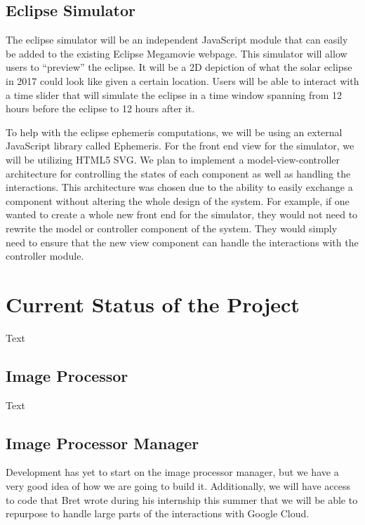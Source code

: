 \documentclass[10pt, onecolumn, draftclsnofoot, letterpaper, compsoc]{IEEEtran}
\begin{document}
\subsection{Eclipse Simulator}

The eclipse simulator will be an independent JavaScript module that can easily
be added to the existing Eclipse Megamovie webpage. This simulator will allow
users to “preview” the eclipse. It will be a 2D depiction of what the solar
eclipse in 2017 could look like given a certain location. Users will be able
to interact with a time slider that will simulate the eclipse in a time
window spanning from 12 hours before the eclipse to 12 hours after it.

To help with the eclipse ephemeris computations, we will be using an external
JavaScript library called Ephemeris. For the front end view for the simulator,
we will be utilizing HTML5 SVG. We plan to implement a model-view-controller
architecture for controlling the states of each component as well as handling
the interactions. This architecture was chosen due to the ability to easily
exchange a component without altering the whole design of the system. For
example, if one wanted to create a whole new front end for the simulator,
they would not need to rewrite the model or controller component of the system.
They would simply need to ensure that the new view component can handle the
interactions with the controller module.


\section{Current Status of the Project}

Text

\subsection{Image Processor}

Text

\subsection{Image Processor Manager}

Development has yet to start on the image processor manager, but we have a very good idea of how we
are going to build it. Additionally, we will have access to code that Bret wrote during his internship
this summer that we will be able to repurpose to handle large parts of the interactions with Google Cloud.
\end{document}
